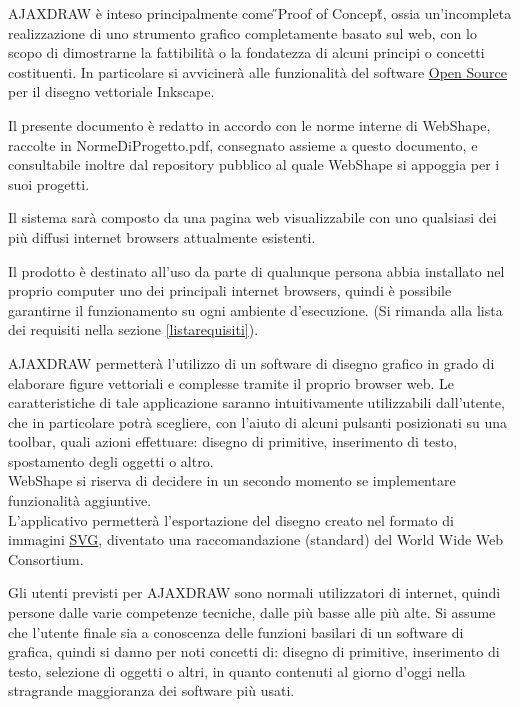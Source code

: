AJAXDRAW \`e inteso principalmente come \H{}Proof of Concept\H{}, ossia un'incompleta realizzazione di uno strumento grafico completamente basato sul web, con lo scopo di dimostrarne la fattibilit\`a o la fondatezza di alcuni principi o concetti costituenti. In particolare si avviciner\` a alle funzionalit\`a  del software \underline{Open Source} per il disegno vettoriale Inkscape.

Il presente documento \`e redatto in accordo con le norme interne di WebShape, raccolte in NormeDiProgetto.pdf, consegnato assieme a questo documento, e consultabile inoltre dal repository pubblico al quale WebShape si appoggia per i suoi progetti.



Il sistema sar\`a composto da una pagina web visualizzabile con uno qualsiasi dei pi\`u diffusi internet browsers attualmente esistenti.

Il prodotto \`e destinato all'uso da parte di qualunque persona abbia installato nel proprio computer uno dei principali internet browsers, quindi \`e possibile garantirne il funzionamento su ogni ambiente d'esecuzione. (Si rimanda alla lista dei requisiti nella sezione \ref{listarequisiti}).

AJAXDRAW permetter\`a l'utilizzo di un software di disegno grafico in grado di elaborare figure vettoriali e complesse tramite il proprio browser web. Le caratteristiche di tale applicazione saranno intuitivamente utilizzabili dall'utente, che in particolare potr\`a scegliere, con l'aiuto di alcuni pulsanti posizionati su una toolbar, quali azioni effettuare: disegno di primitive, inserimento di testo, spostamento degli oggetti o altro.\\
WebShape si riserva di decidere in un secondo momento se implementare funzionalit\`a aggiuntive.\\%
L'applicativo permetter\`a l'esportazione del disegno creato nel formato di immagini \underline{SVG}, diventato una raccomandazione (standard) del World Wide Web Consortium.

\label{definizione_utente}
Gli utenti previsti per AJAXDRAW sono normali utilizzatori di internet, quindi persone dalle varie competenze tecniche, dalle pi\`u basse alle pi\`u alte. Si assume che l'utente finale sia a conoscenza delle funzioni basilari di un software di grafica, quindi si danno per noti concetti di: disegno di primitive, inserimento di testo, selezione di oggetti o altri, in quanto contenuti al giorno d'oggi nella stragrande maggioranza dei software pi\`u usati.

